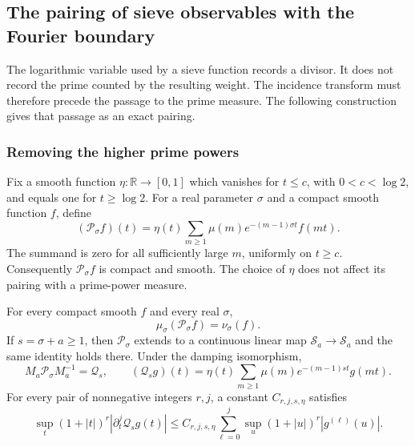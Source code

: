 \subsection{The pairing of sieve observables with the Fourier boundary}
\label{acfp:section}

The logarithmic variable used by a sieve function records a divisor.
It does not record the prime counted by the resulting weight.
The incidence transform must therefore precede the passage to the prime measure.
The following construction gives that passage as an exact pairing.

\subsubsection{Removing the higher prime powers}

Fix a smooth function $\eta:\mathbb R\to[0,1]$ which vanishes for
$t\leq c$, with $0<c<\log2$, and equals one for $t\geq\log2$.
For a real parameter $\sigma$ and a compact smooth function $f$, define
\begin{equation}\label{acfp:mobius-test}
 (\mathcal P_\sigma f)(t)
   =\eta(t)\sum_{m\geq1}\mu(m)e^{-(m-1)\sigma t}f(mt).
\end{equation}
The summand is zero for all sufficiently large $m$, uniformly on $t\geq c$.
Consequently $\mathcal P_\sigma f$ is compact and smooth.
The choice of $\eta$ does not affect its pairing with a prime-power measure.

\begin{proposition}\label{acfp:prime-projection}
For every compact smooth $f$ and every real $\sigma$,
\begin{equation}\label{acfp:projection-pairing}
 \mu_\sigma(\mathcal P_\sigma f)=\nu_\sigma(f).
\end{equation}
If $s=\sigma+a\geq1$, then $\mathcal P_\sigma$ extends to a continuous
linear map $\mathcal S_a\to\mathcal S_a$ and the same identity holds there.
Under the damping isomorphism,
\[
 M_a\mathcal P_\sigma M_a^{-1}=\mathcal Q_s,\qquad
 (\mathcal Q_sg)(t)
    =\eta(t)\sum_{m\geq1}\mu(m)e^{-(m-1)st}g(mt).
\]
For every pair of nonnegative integers $r,j$, a constant $C_{r,j,s,\eta}$
satisfies
\begin{equation}\label{acfp:projection-norm}
 \sup_t(1+|t|)^r|\partial_t^j\mathcal Q_sg(t)|
 \leq C_{r,j,s,\eta}
       \sum_{\ell=0}^j\sup_u(1+|u|)^r|g^{(\ell)}(u)|.
\end{equation}
\end{proposition}

